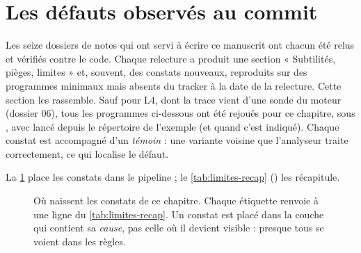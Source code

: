 \section{Les défauts observés au commit \texorpdfstring{}{e67b10a}}
\label{sec:limites-perspectives-defauts}

Les seize dossiers de notes qui ont servi à écrire ce manuscrit ont chacun été relus et vérifiés contre le code. Chaque relecture a produit une section « Subtilités, pièges, limites » et, souvent, des constats nouveaux, reproduits sur des programmes minimaux mais absents du tracker à la date de la relecture. Cette section les rassemble. Sauf pour L4, dont la trace vient d'une sonde du moteur (dossier 06), tous les programmes ci-dessous ont été rejoués pour ce chapitre, sous , avec  lancé depuis le répertoire de l'exemple (et  quand c'est indiqué). Chaque constat est accompagné d'un \emph{témoin} : une variante voisine que l'analyseur traite correctement, ce qui localise le défaut.

La \cref{fig:limites-carte} place les constats dans le pipeline ; le \cref{tab:limites-recap} () les récapitule.

\begin{figure}[htbp]\centering
{}
\caption{Où naissent les constats de ce chapitre. Chaque étiquette renvoie à une ligne du \cref{tab:limites-recap}. Un constat est placé dans la couche qui contient sa \emph{cause}, pas celle où il devient visible : presque tous se voient dans les règles.}
\label{fig:limites-carte}
\end{figure}

